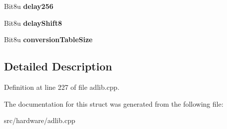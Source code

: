 \begin{DoxyCompactItemize}
\item 
\hypertarget{structAdlib_1_1RawHeader_a1fd40a8fe5a9771c58e969db0a9e0386}{Bit8u {\bfseries delay256}}\label{structAdlib_1_1RawHeader_a1fd40a8fe5a9771c58e969db0a9e0386}

\item 
\hypertarget{structAdlib_1_1RawHeader_a73598973dbc467633ad076135d19223a}{Bit8u {\bfseries delay\-Shift8}}\label{structAdlib_1_1RawHeader_a73598973dbc467633ad076135d19223a}

\item 
\hypertarget{structAdlib_1_1RawHeader_a11b787b47fad2e30661ff1846811c823}{Bit8u {\bfseries conversion\-Table\-Size}}\label{structAdlib_1_1RawHeader_a11b787b47fad2e30661ff1846811c823}

\end{DoxyCompactItemize}


\subsection{Detailed Description}


Definition at line 227 of file adlib.\-cpp.



The documentation for this struct was generated from the following file\-:\begin{DoxyCompactItemize}
\item 
src/hardware/adlib.\-cpp\end{DoxyCompactItemize}
